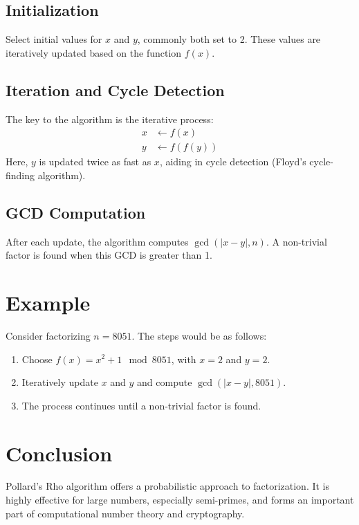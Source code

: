 \documentclass{article}
\begin{document}
\subsection{Initialization}
Select initial values for $x$ and $y$, commonly both set to 2. These values are iteratively updated based on the function $f(x)$.

\subsection{Iteration and Cycle Detection}
The key to the algorithm is the iterative process:
\begin{align*}
x & \leftarrow f(x) \\
y & \leftarrow f(f(y))
\end{align*}
Here, $y$ is updated twice as fast as $x$, aiding in cycle detection (Floyd's cycle-finding algorithm).

\subsection{GCD Computation}
After each update, the algorithm computes $\gcd(|x - y|, n)$. A non-trivial factor is found when this GCD is greater than 1.

\section{Example}
Consider factorizing $n = 8051$. The steps would be as follows:
\begin{enumerate}
    \item Choose $f(x) = x^2 + 1 \mod 8051$, with $x = 2$ and $y = 2$.
    \item Iteratively update $x$ and $y$ and compute $\gcd(|x - y|, 8051)$.
    \item The process continues until a non-trivial factor is found.
\end{enumerate}

\section{Conclusion}
Pollard's Rho algorithm offers a probabilistic approach to factorization. It is highly effective for large numbers, especially semi-primes, and forms an important part of computational number theory and cryptography.
\end{document}
